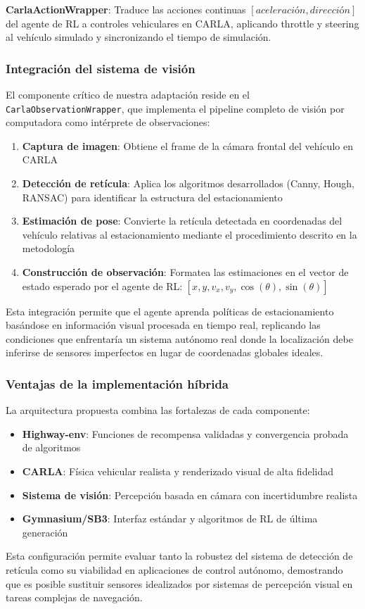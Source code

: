 \noindent
\textbf{CarlaActionWrapper}: Traduce las acciones continuas $[aceleración, dirección]$ del agente de RL
a controles vehiculares en CARLA, aplicando throttle y steering al vehículo simulado y sincronizando
el tiempo de simulación.

\subsubsection{Integración del sistema de visión}
\noindent
El componente crítico de nuestra adaptación reside en el \texttt{CarlaObservationWrapper}, que implementa
el pipeline completo de visión por computadora como intérprete de observaciones:

\begin{enumerate}
    \item \textbf{Captura de imagen}: Obtiene el frame de la cámara frontal del vehículo en CARLA
    \item \textbf{Detección de retícula}: Aplica los algoritmos desarrollados (Canny, Hough, RANSAC)
    para identificar la estructura del estacionamiento
    \item \textbf{Estimación de pose}: Convierte la retícula detectada en coordenadas del vehículo
    relativas al estacionamiento mediante el procedimiento descrito en la metodología
    \item \textbf{Construcción de observación}: Formatea las estimaciones en el vector de estado
    esperado por el agente de RL: $[x, y, v_x, v_y, \cos(\theta), \sin(\theta)]$
\end{enumerate}

\noindent
Esta integración permite que el agente aprenda políticas de estacionamiento basándose en información
visual procesada en tiempo real, replicando las condiciones que enfrentaría un sistema autónomo real
donde la localización debe inferirse de sensores imperfectos en lugar de coordenadas globales ideales.

\subsubsection{Ventajas de la implementación híbrida}
\noindent
La arquitectura propuesta combina las fortalezas de cada componente:
\begin{itemize}
    \item \textbf{Highway-env}: Funciones de recompensa validadas y convergencia probada de algoritmos
    \item \textbf{CARLA}: Física vehicular realista y renderizado visual de alta fidelidad
    \item \textbf{Sistema de visión}: Percepción basada en cámara con incertidumbre realista
    \item \textbf{Gymnasium/SB3}: Interfaz estándar y algoritmos de RL de última generación
\end{itemize}

\noindent
Esta configuración permite evaluar tanto la robustez del sistema de detección de retícula
como su viabilidad en aplicaciones de control autónomo, demostrando que es posible sustituir
sensores idealizados por sistemas de percepción visual en tareas complejas de navegación.
